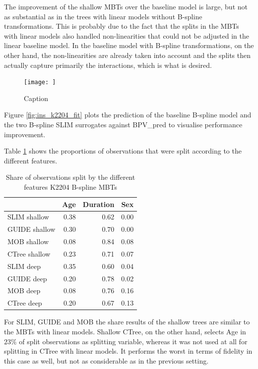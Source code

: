 The improvement of the shallow MBTs over the baseline model is large, but not as substantial as in the trees with linear models without B-spline transformations. This is probably due to the fact that the splits in the MBTs with linear models also handled non-linearities that could not be adjusted in the linear baseline model. In the baseline model with B-spline transformations, on the other hand, the non-linearities are already taken into account and the splits then actually capture primarily the interactions, which is what is desired. 

\begin{figure}
    \centering
    \texttt{[image: ]}
    \caption{Caption}
    \label{fig:my_label}
\end{figure}
Figure \ref{fig:ins_k2204_fit} plots the prediction of the baseline B-spline model and the two B-spline SLIM surrogates against BPV\_pred to visualise performance improvement.


Table \ref{tab:ins_k2204_bsplines_surrogates_share}  shows the proportions of observations that were split according to the different features. 


\begin{table}[!htb]
\caption{Share of observations split by the different features K2204 B-spline MBTs}
\centering
\begin{tabular}[t]{l|r|r|r}
\hline
  & Age & Duration & Sex\\
\hline
SLIM shallow & 0.38 & 0.62 & 0.00\\
GUIDE shallow & 0.30 & 0.70 & 0.00\\
MOB shallow & 0.08 & 0.84 & 0.08\\
CTree shallow & 0.23 & 0.71 & 0.07\\
\hline
SLIM deep & 0.35 & 0.60 & 0.04\\
GUIDE deep & 0.20 & 0.78 & 0.02\\
MOB deep & 0.08 & 0.76 & 0.16\\
CTree deep & 0.20 & 0.67 & 0.13\\
\hline
\end{tabular}
\label{tab:ins_k2204_bsplines_surrogates_share}
\end{table}

For SLIM, GUIDE and MOB the share results of the shallow trees are similar to the MBTs with linear models. Shallow CTree, on the other hand, selects Age in $23\%$ of split observations as splitting variable, whereas it was not used at all for splitting in CTree with linear models. It performs the worst in terms of fidelity in this case as well, but not as considerable as in the previous setting.

